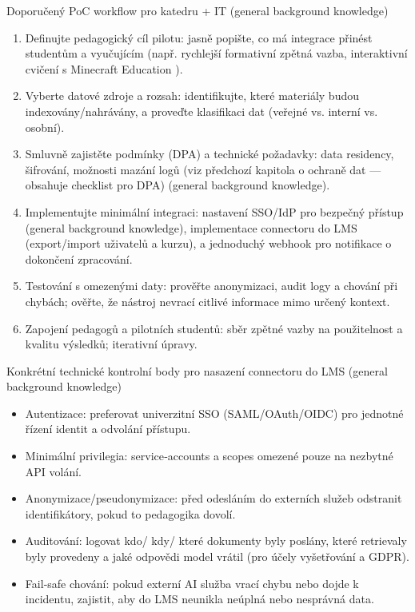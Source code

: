 Doporučený PoC workflow pro katedru + IT (general background knowledge)
\begin{enumerate}
  \item Definujte pedagogický cíl pilotu: jasně popište, co má integrace přinést studentům a vyučujícím (např. rychlejší formativní zpětná vazba, interaktivní cvičení s Minecraft Education \cite{kb_ai_101_tipu_pdf_04e4a115_page_15_2}).
  \item Vyberte datové zdroje a rozsah: identifikujte, které materiály budou indexovány/nahrávány, a proveďte klasifikaci dat (veřejné vs. interní vs. osobní).
  \item Smluvně zajistěte podmínky (DPA) a technické požadavky: data residency, šifrování, možnosti mazání logů (viz předchozí kapitola o ochraně dat — obsahuje checklist pro DPA) (general background knowledge).
  \item Implementujte minimální integraci: nastavení SSO/IdP pro bezpečný přístup (general background knowledge), implementace connectoru do LMS (export/import uživatelů a kurzu), a jednoduchý webhook pro notifikace o dokončení zpracování.
  \item Testování s omezenými daty: prověřte anonymizaci, audit logy a chování při chybách; ověřte, že nástroj nevrací citlivé informace mimo určený kontext.
  \item Zapojení pedagogů a pilotních studentů: sběr zpětné vazby na použitelnost a kvalitu výsledků; iterativní úpravy.
\end{enumerate}

Konkrétní technické kontrolní body pro nasazení connectoru do LMS (general background knowledge)
\begin{itemize}
  \item Autentizace: preferovat univerzitní SSO (SAML/OAuth/OIDC) pro jednotné řízení identit a odvolání přístupu.
  \item Minimální privilegia: service‑accounts a scopes omezené pouze na nezbytné API volání.
  \item Anonymizace/pseudonymizace: před odesláním do externích služeb odstranit identifikátory, pokud to pedagogika dovolí.
  \item Auditování: logovat kdo/ kdy/ které dokumenty byly poslány, které retrievaly byly provedeny a jaké odpovědi model vrátil (pro účely vyšetřování a GDPR).
  \item Fail‑safe chování: pokud externí AI služba vrací chybu nebo dojde k incidentu, zajistit, aby do LMS neunikla neúplná nebo nesprávná data.
\end{itemize}

